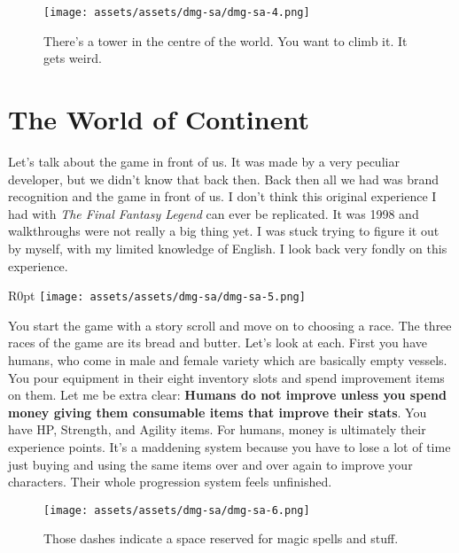 \documentclass{book}
\begin{document}
\begin{figure}[hbt]
\vskip 10pt
\centering \texttt{[image: assets/assets/dmg-sa/dmg-sa-4.png]}\par\pagetwodescription There’s a tower in the centre of the world. You want to climb it. It gets weird.
\vskip 6pt
\end{figure}

\FloatBarrier\needspace{10mm}\section*{The World of Continent}\nopagebreak[4]

Let’s talk about the game in front of us. It was made by a very peculiar developer, but we didn’t know that back then. Back then all we had was brand recognition and the game in front of us. I don’t think this original experience I had with \emph{The Final Fantasy Legend} can ever be replicated. It was 1998 and walkthroughs were not really a big thing yet. I was stuck trying to figure it out by myself, with my limited knowledge of English. I look back very fondly on this experience.

\begin{wrapfigure}{R}{0pt} \texttt{[image: assets/assets/dmg-sa/dmg-sa-5.png]}\end{wrapfigure}
You start the game with a story scroll and move on to choosing a race. The three races of the game are its bread and butter. Let’s look at each. First you have humans, who come in male and female variety which are basically empty vessels. You pour equipment in their eight inventory slots and spend improvement items on them. Let me be extra clear: \textbf{Humans do not improve unless you spend money giving them consumable items that improve their stats}. You have HP, Strength, and Agility items. For humans, money is ultimately their experience points. It’s a maddening system because you have to lose a lot of time just buying and using the same items over and over again to improve your characters. Their whole progression system feels unfinished.

\begin{figure}[hbt]
\vskip 10pt
\centering \texttt{[image: assets/assets/dmg-sa/dmg-sa-6.png]}\par\pagetwodescription Those dashes indicate a space reserved for magic spells and stuff.
\vskip 6pt
\end{figure}
\end{document}
